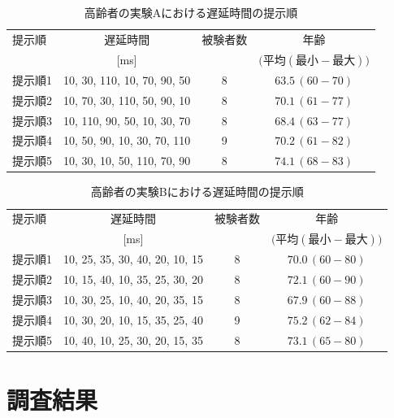 \begin{table}[btp]
  \caption{高齢者の実験Aにおける遅延時間の提示順}
  \label{table:old_a}
  \centering
  \begin{tabular}{lccc}
    \hline
    提示順 & 遅延時間 & 被験者数 & 年齢\\
    　& [ms] & & $\bigl(平均 (最小-最大)\bigr)$\\
    \hline \hline
    提示順1  & 10, 30, 110, 10, 70, 90, 50  & 8 & $63.5\, (60-70)$\\
    提示順2  & 10, 70, 30, 110, 50, 90, 10  & 8 & $70.1\, (61-77)$\\
    提示順3  & 10, 110, 90, 50, 10, 30, 70  & 8 & $68.4\, (63-77)$\\
    提示順4  & 10, 50, 90, 10, 30, 70, 110  & 9 & $70.2\, (61-82)$\\
    提示順5  & 10, 30, 10, 50, 110, 70, 90  & 8 & $74.1\, (68-83)$
\\
    \hline
  \end{tabular}
\end{table}
\begin{table}[btp]
  \caption{高齢者の実験Bにおける遅延時間の提示順}
  \label{table:old_b}
  \centering
  \begin{tabular}{lccc}
    \hline
    提示順 & 遅延時間 & 被験者数 & 年齢\\
    　& [ms] & & $\bigl(平均 (最小-最大)\bigr)$\\
    \hline \hline
    提示順1  & 10, 25, 35, 30, 40, 20, 10, 15  & 8 & $70.0\,(60-80)$\\
    提示順2  & 10, 15, 40, 10, 35, 25, 30, 20  & 8 & $72.1\,(60-90)$\\
    提示順3  & 10, 30, 25, 10, 40, 20, 35, 15  & 8 & $67.9\,(60-88)$\\
    提示順4  & 10, 30, 20, 10, 15, 35, 25, 40  & 9 & $75.2\,(62-84)$\\
    提示順5  & 10, 40, 10, 25, 30, 20, 15, 35  & 8 & $73.1\,(65-80)$
\\
    \hline
  \end{tabular}
\end{table}
\newpage
\section{調査結果}
